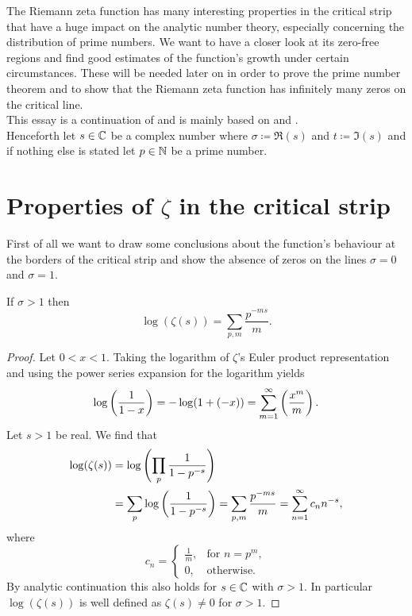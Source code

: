 The Riemann zeta function has many interesting properties in the critical strip that have a huge impact on the analytic number theory, especially concerning the distribution of prime numbers. We want to have a closer look at its zero-free regions and find good estimates of the function's growth under certain circumstances. These will be needed later on in order to prove the prime number theorem and to show that the Riemann zeta function has infinitely many zeros on the critical line. \\
This essay is a continuation of \cite{Jesacher2016} and is mainly based on \cite{Ahlfors1966} and \cite{Titchmarsh1986}. \\
Henceforth let $s \in \mathbb{C}$ be a complex number where $\sigma \coloneqq \Re(s)$ and $t \coloneqq \Im(s)$ and if nothing else is stated let $p \in \mathbb{N}$ be a prime number.


\section{Properties of $\zeta$ in the critical strip}
First of all we want to draw some conclusions about the function's behaviour at the borders of the critical strip and show the absence of zeros on the lines $\sigma = 0$ and $\sigma = 1$.


\begin{lemma}\label{lem:LogEulerProd}
	If $\sigma > 1$ then
\begin{equation*}
	\log(\zeta(s)) = \sum _{p,m} \frac{p^{-ms}}{m}.
\end{equation*}
\end{lemma}
\begin{proof}
	Let $0 < x < 1$. Taking the logarithm of $\zeta$'s Euler product representation and using the power series expansion for the logarithm yields
\begin{equation*}
	\log\left(\frac{1}{1 - x}\right) = -\log(1 + (-x)) = \sum _{m = 1} ^\infty \left(\frac{x^m}{m}\right).
\end{equation*}
	Let $s > 1$ be real. We find that
\begin{equation*}
\begin{aligned}	
	\log(\zeta(s)) 
		&= \log\left(\prod _p \frac{1}{1 - p^{-s}}\right) \\
		&= \sum _p \log\left(\frac{1}{1 - p^{-s}}\right)
		= \sum _{p,m} \frac{p^{-ms}}{m} = \sum _{n=1} ^{\infty} c_n n^{-s},
\end{aligned}
\end{equation*}
	where
\begin{equation*}
    c_n =
    \left\{
    	\begin{array}{ll}
        	\frac{1}{m}, & \text{for } n = p^m, \\
        	0, & \text{otherwise.}
        \end{array}
	\right.
\end{equation*}
	By analytic continuation this also holds for $s \in \mathbb{C}$ with $\sigma > 1$. In particular $\log(\zeta(s))$ is well defined as $\zeta(s) \neq 0$ for $\sigma > 1$.
\end{proof}


